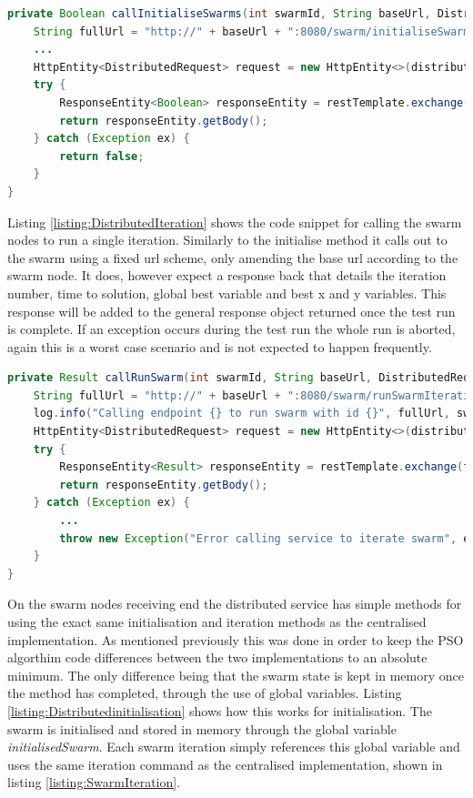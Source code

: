 \documentclass[oneside,12pt]{book}
\begin{document}
\begin{lstlisting}[basicstyle=\footnotesize, language=Java]
private Boolean callInitialiseSwarms(int swarmId, String baseUrl, DistributedRequest distributedRequest) {
    String fullUrl = "http://" + baseUrl + ":8080/swarm/initialiseSwarm";
    ...
    HttpEntity<DistributedRequest> request = new HttpEntity<>(distributedRequest);
    try {
        ResponseEntity<Boolean> responseEntity = restTemplate.exchange(fullUrl, HttpMethod.POST, request, Boolean.class);
        return responseEntity.getBody();
    } catch (Exception ex) {
        return false;
    }
}
\end{lstlisting}
\label{listing:DistributedInit}

Listing \ref{listing:DistributedIteration} shows the code snippet for calling the swarm nodes to run a single iteration. Similarly to the initialise method it calls out to the swarm using a fixed url scheme, only amending the base url according to the swarm node. It does, however expect a response back that details the iteration number, time to solution, global best variable and best x and y variables. This response will be added to the general response object returned once the test run is complete. If an exception occurs during the test run the whole run is aborted, again this is a worst case scenario and is not expected to happen frequently. 

\begin{lstlisting}[basicstyle=\footnotesize, language=Java]
private Result callRunSwarm(int swarmId, String baseUrl, DistributedRequest distributedRequest) {
    String fullUrl = "http://" + baseUrl + ":8080/swarm/runSwarmIteration";
    log.info("Calling endpoint {} to run swarm with id {}", fullUrl, swarmId);
    HttpEntity<DistributedRequest> request = new HttpEntity<>(distributedRequest);
    try {
        ResponseEntity<Result> responseEntity = restTemplate.exchange(fullUrl, HttpMethod.POST, request, Result.class);
        return responseEntity.getBody();
    } catch (Exception ex) {
        ...
        throw new Exception("Error calling service to iterate swarm", ex);
    }
}
\end{lstlisting}
\label{listing:DistributedIteration}

On the swarm nodes receiving end the distributed service has simple methods for using the exact same initialisation and iteration methods as the centralised implementation. As mentioned previously this was done in order to keep the PSO algorthim code differences between the two implementations to an absolute minimum. The only difference being that the swarm state is kept in memory once the method has completed, through the use of global variables. Listing \ref{listing:Distributedinitialisation} shows how this works for initialisation. The swarm is initialised and stored in memory through the global variable \textit{initialisedSwarm}. Each swarm iteration simply references this global variable and uses the same iteration command as the centralised implementation, shown in listing \ref{listing:SwarmIteration}.
\end{document}
